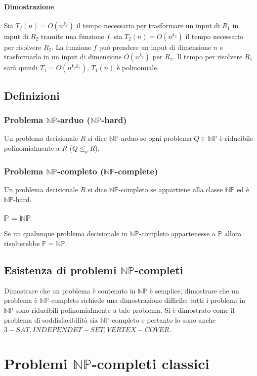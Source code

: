 \paragraph{Dimostrazione}
Sia $T_f(n)=O(n^{k_f})$ il tempo necessario per trasformare un input di $R_1$ in input di $R_2$ tramite una funzione $f$, sia $T_2(n)=O(n^{k_2})$ il tempo necessario per risolvere $R_2$.
La funzione $f$ pu\`o prendere un input di dimensione $n$ e trasformarlo in un input di dimensione $O(n^{k_f})$ per $R_2$. Il tempo per risolvere $R_1$ sar\`a quindi $T_1=O(n^{k_fk_2})$,
$T_1(n)$ \`e polinomiale.
\subsection{Definizioni}
\subsubsection{Problema $\mathbf{\mathbb{NP}}$-arduo ($\mathbf{\mathbb{NP}}$-hard)}
Un problema decisionale $R$ si dice $\mathbb{NP}$-arduo se ogni problema $Q\in\mathbb{NP}$ \`e riducibile polinomialmente a $R$ ($Q\le_p R$).
\subsubsection{Problema $\mathbf{\mathbb{NP}}$-completo ($\mathbf{\mathbb{NP}}$-complete)}
Un problema decisionale $R$ si dice $\mathbb{NP}$-completo se appartiene alla classe $\mathbb{NP}$ ed \`e $\mathbb{NP}$-hard.
\subsubsection{$\mathbf{\mathbb{P}=\mathbb{NP}}$}
Se un qualunque problema decisionale in $\mathbb{NP}$-completo appartenesse a $\mathbb{P}$ allora risulterebbe $\mathbb{P}=\mathbb{NP}$.
\subsection{Esistenza di problemi $\mathbf{\mathbb{NP}}$-completi}
Dimostrare che un problema \`e contenuto in $\mathbb{NP}$ \`e semplice, dimostrare che un problema \`e $\mathbb{NP}$-completo richiede una dimostrazione difficile: tutti i problemi in
$\mathbb{NP}$ sono riducibili polinomialmente a tale problema. Si \`e dimostrato come il problema di soddisfacibilit\`a sia $\mathbb{NP}$-completo e pertanto lo sono anche $3-SAT, 
INDEPENDET-SET, VERTEX-COVER$.
\section{Problemi $\mathbf{\mathbb{NP}}$-completi classici}
